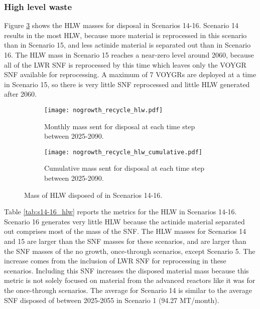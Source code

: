 \subsubsection{High level waste}
Figure \ref{fig:nogrowth_recycle_hlw} shows the 
\gls{HLW} masses for disposal in Scenarios 14-16. Scenario 
14 results in the most \gls{HLW}, because more 
material is reprocessed in this scenario than in Scenario 15, 
and less actinide material is separated out than in 
Scenario 16. The \gls{HLW} mass in Scenario 15 reaches a 
near-zero level around 2060, because all of the \gls{LWR} 
\gls{SNF} is reprocessed by this time which leaves only
the VOYGR \gls{SNF} available for reprocessing. A 
maximum of 7 VOYGRs are deployed at a time in Scenario 
15, so there is very little \gls{SNF} reprocessed and 
little \gls{HLW} generated after 2060. 

\begin{figure}[h!]
    \centering
    \begin{subfigure}[b]{0.49\textwidth}
        \centering
        \texttt{[image: nogrowth\_recycle\_hlw.pdf]}
        \caption{Monthly mass sent for disposal 
        at each time step between 2025-2090.}
        \label{fig:nogrowth_recycle_hlw_all}
    \end{subfigure}
    \hfill
    \begin{subfigure}[b]{0.49\textwidth}
        \centering
        \texttt{[image: nogrowth\_recycle\_hlw\_cumulative.pdf]}
        \caption{Cumulative mass sent for disposal 
        at each time step between 2025-2090.}
        \label{fig:nogrowth_recycle_hlw_cumulative}
    \end{subfigure}
       \caption{Mass of \gls{HLW} disposed of in Scenarios 14-16.}
       \label{fig:nogrowth_recycle_hlw}
\end{figure}

Table \ref{tab:s14-16_hlw} reports the metrics for the \gls{HLW} 
in Scenarios 14-16. Scenario 16 generates very little 
\gls{HLW} because the actinide material separated out 
comprises most of the mass of the \gls{SNF}. The \gls{HLW} 
masses for Scenarios 14 and 15 are larger than the \gls{SNF} 
masses for these scenarios, and are larger than the \gls{SNF} 
masses of the no growth, once-through scenarios, except 
Scenario 5. The increase 
comes from the inclusion of \gls{LWR} \gls{SNF} for reprocessing 
in these scenarios. Including this \gls{SNF} increases the 
disposed material mass because this metric is not solely focused 
on material from the advanced reactors like it was for 
the once-through scenarios. The average for 
Scenario 14 is similar to the average \gls{SNF} disposed of 
between 2025-2055 in Scenario 1 (94.27 MT/month). 

